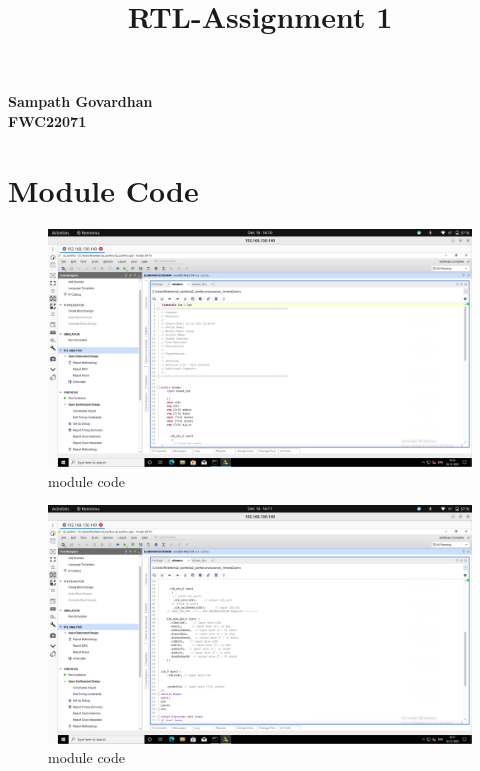 \documentclass{article}
\title{
RTL-Assignment 1
}
\begin{document}
\maketitle
\hfill \textbf{Sampath Govardhan} \\
\null \hfill \textbf{FWC22071}\\
\tableofcontents
\section{Module Code}

\begin{figure}[h]
    \centering
\includegraphics[width=\columnwidth]{codes/module code/mc1.png}
    \caption{module code}
    \label{fig:my_label}
\end{figure}
\vspace{5cm}
\begin{figure}[h]
    \centering
\includegraphics[width=\columnwidth]{codes/module code/mc2.png}
    \caption{module code}
    \label{fig:my_label}
\end{figure}
\vspace{5cm}
\end{document}
